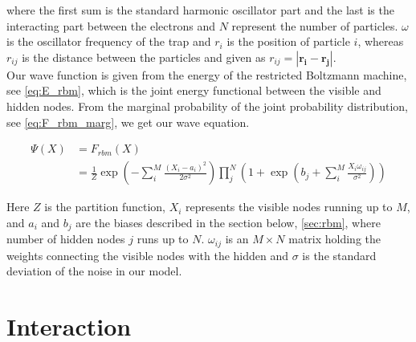 where the first sum is the standard harmonic oscillator part and the last is the interacting part between the electrons and $N$ represent the number of particles. $\omega$ is the oscillator frequency of the trap and $r_i$ is the position of particle $i$, whereas $r_{ij}$ is the distance between the particles and given as $r_{ij} = |\mathbf{r_i} - \mathbf{r_j}|$. \\
Our wave function is given from the energy of the restricted Boltzmann machine, see \eqref{eq:E_rbm}, which is the joint energy functional between the visible and hidden nodes. From the marginal probability of the joint probability distribution, see \eqref{eq:F_rbm_marg}, we get our wave equation.                     

\begin{align}\label{eq:F_rbm}
\Psi(X) &= F_{rbm}(X) \\
&= \frac{1}{Z} \exp \left( -\sum_{i}^{M} \frac{(X_i - a_i)^2}{2 \sigma^2} \right) \prod_{j}^{N} \left( 1 + \exp \left( b_j + \sum_{i}^{M} \frac{X_i \omega_{ij}}{\sigma^2} \right) \right)
\end{align}

Here $Z$ is the partition function, $X_i$ represents the visible nodes running up to $M$, and $a_i$ and $b_j$ are the biases described in the section below, \eqref{sec:rbm}, where number of hidden nodes $j$ runs up to $N$. 
$\omega_{ij}$ is an $M \times N$ matrix holding the weights connecting the visible nodes with the hidden and $\sigma$ is the standard deviation of the noise in our model. \\

\section{Interaction}